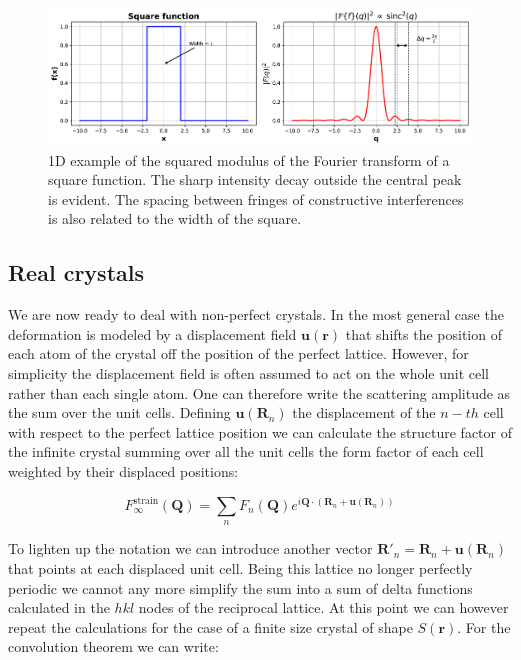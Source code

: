\begin{figure}[H]
    \centering
    \includegraphics[width=\textwidth]{figures/Intro/square.pdf}
    \caption{1D example of the squared modulus of the Fourier transform of a square function. The sharp intensity decay 
     outside the central peak is evident. The spacing between fringes of constructive interferences is also related 
     to the width of the square.}
    \label{fig:square_ft}
\end{figure}

\subsection{Real crystals}
We are now ready to deal with non-perfect crystals. In the most general case the deformation is modeled by a displacement field $\mathbf{u(r)}$ 
that shifts the position of each atom of the crystal off the position of the perfect lattice. However, for simplicity 
the displacement field is often assumed to act on the whole unit cell rather than each single atom. One can therefore 
write the scattering amplitude as the sum over the unit cells. 
Defining $\mathbf{u}(\mathbf{R}_n)$ the displacement of the $n-th$ cell with respect to the perfect lattice position 
we can calculate the structure factor of the infinite crystal summing over all the unit cells the form factor of each cell weighted by 
their displaced positions: 

\begin{equation}
    F^{\text{strain}}_{\infty}(\mathbf{Q}) = 
    \sum_{n} F_n(\mathbf{Q}) e^{i \mathbf{Q} \cdot (\mathbf{R}_n + \mathbf{u}(\mathbf{R}_n))}
   \label{eq:strain1}
\end{equation} 

To lighten up the notation we can introduce another vector $\mathbf{R}'_n = \mathbf{R}_n + \mathbf{u}(\mathbf{R}_n)$ that 
points at each displaced unit cell. Being this lattice no longer perfectly periodic we cannot any more simplify the sum 
into a sum of delta functions calculated in the $hkl$ nodes of the reciprocal lattice. 
At this point we can however repeat the calculations for the case of a finite size crystal of shape $S(\mathbf{r})$. 
For the convolution theorem we can write: 

